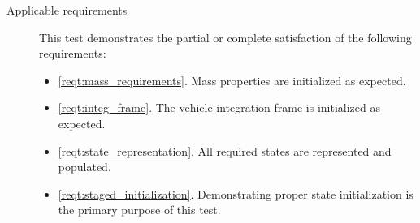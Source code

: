 \begin{description}
\item[Applicable requirements]
This test demonstrates the partial or complete satisfaction of the
following requirements:
\begin{itemize}
\item \ref{reqt:mass_requirements}.
Mass properties are initialized as expected.
\item \ref{reqt:integ_frame}.
The vehicle integration frame is initialized as expected.
\item \ref{reqt:state_representation}.
All required states are represented and populated.
\item \ref{reqt:staged_initialization}.
Demonstrating proper state initialization is the primary purpose
of this test.
\end{itemize}
\end{description}

